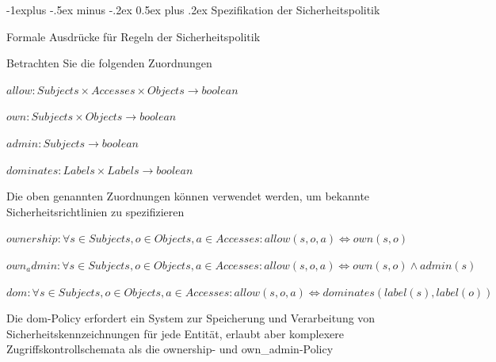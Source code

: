 \documentclass[a4paper]{article}
\makeatletter
\renewcommand{\subsection}{\@startsection{subsection}{2}{0mm}%
 {-1explus -.5ex minus -.2ex}%
 {0.5ex plus .2ex}%
 {\normalfont\normalsize\bfseries}}
\makeatother
\begin{document}
\begin{multicols}{3}
      \subsection{Spezifikation der Sicherheitspolitik}
      \begin{itemize*}
            \item Formale Ausdrücke für Regeln der Sicherheitspolitik
            \item Betrachten Sie die folgenden Zuordnungen
            \begin{itemize*}
                  \item $allow: Subjects \times Accesses \times Objects \rightarrow boolean$
                  \item $own: Subjects \times Objects \rightarrow boolean$
                  \item $admin: Subjects \rightarrow boolean$
                  \item $dominates: Labels \times Labels \rightarrow boolean$
            \end{itemize*}
            \item Die oben genannten Zuordnungen können verwendet werden, um bekannte Sicherheitsrichtlinien zu spezifizieren
            \begin{itemize*}
                  \item $ownership: \forall s \in Subjects, o \in Objects, a \in Accesses: allow(s, o, a) \Leftrightarrow own(s, o)$
                  \item $own_admin: \forall s \in Subjects, o \in Objects, a \in Accesses: allow(s, o, a) \Leftrightarrow own(s, o) \wedge admin(s)$
                  \item $dom: \forall s \in Subjects, o \in Objects, a \in Accesses: allow(s, o, a) \Leftrightarrow dominates(label(s), label(o))$
            \end{itemize*}
            \item Die dom-Policy erfordert ein System zur Speicherung und Verarbeitung von Sicherheitskennzeichnungen für jede Entität, erlaubt aber komplexere Zugriffskontrollschemata als die ownership- und own\_admin-Policy
      \end{itemize*}


\end{multicols}
\end{document}
